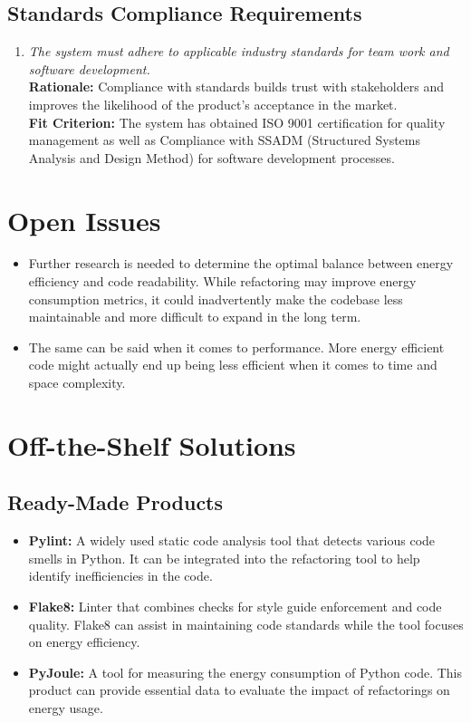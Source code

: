 \documentclass[12pt]{article}
\begin{document}
\subsection{Standards Compliance Requirements}
\begin{enumerate}[label=CR-SCR \arabic*., wide=0pt, leftmargin=*]
	\item \emph{The system must adhere to applicable industry standards for team work and software development.}\\[2mm]
    {\bf Rationale:} Compliance with standards builds trust with stakeholders and improves the likelihood of the product’s acceptance in the market.\\
    {\bf Fit Criterion:} The system has obtained ISO 9001 certification for quality management as well as Compliance with SSADM (Structured Systems Analysis and Design Method) for software development processes.
\end{enumerate}

\section{Open Issues}
\begin{itemize}
  \item Further research is needed to determine the optimal balance between energy efficiency and code readability. While refactoring may improve energy consumption metrics, it could inadvertently make the codebase less maintainable and more difficult to expand in the long term.
  \item The same can be said when it comes to performance. More energy efficient code might actually end up being less efficient when it comes to time and space complexity.
\end{itemize}

\section{Off-the-Shelf Solutions}
\subsection{Ready-Made Products}

\begin{itemize}
  \item \textbf{Pylint:} A widely used static code analysis tool that detects various code smells in Python. It can be integrated into the refactoring tool to help identify inefficiencies in the code.
  \item \textbf{Flake8:} Linter that combines checks for style guide enforcement and code quality. Flake8 can assist in maintaining code standards while the tool focuses on energy efficiency.
  \item \textbf{PyJoule:} A tool for measuring the energy consumption of Python code. This product can provide essential data to evaluate the impact of refactorings on energy usage.
\end{itemize}
\end{document}
